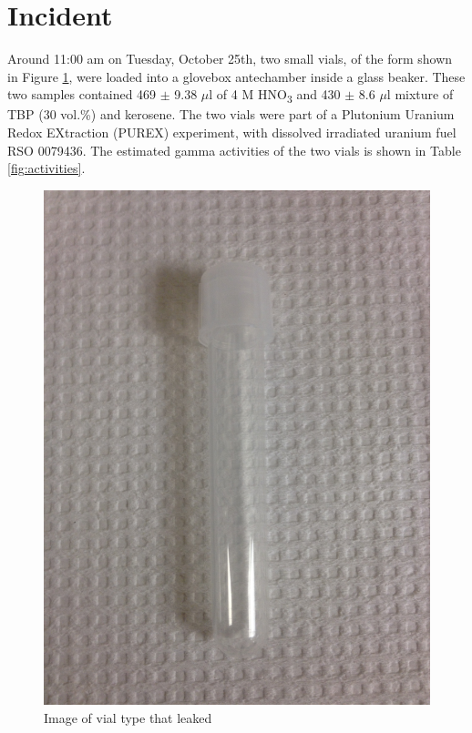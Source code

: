 \documentclass[11pt,notitlepage]{article}
\newcommand{\tsbs}{\textsubscript}
\begin{document}
\vspace*{0.5cm}


 
\section{Incident}
Around 11:00 am on Tuesday, October 25th, two small vials,
of the form shown in Figure \ref{fig:example2},
were loaded into a glovebox antechamber inside a glass beaker.
These two samples contained 469 $\pm$ 9.38 $\mu$l of 4 M HNO\tsbs{3}
and 430 $\pm$ 8.6 $\mu$l mixture of TBP (30 vol.\%) and kerosene.
The two vials were part of a Plutonium Uranium Redox EXtraction (PUREX)
experiment, with dissolved irradiated uranium fuel RSO 0079436.
The estimated gamma activities of the two vials is shown in
Table \ref{fig:activities}.

\begin{figure}[H] %
\begin{center}
  \includegraphics[width=0.75\linewidth]
                  {Figures/image1}
\end{center}
\caption{Image of vial type that leaked}
\label{fig:example2}
\end{figure}
\end{document}
